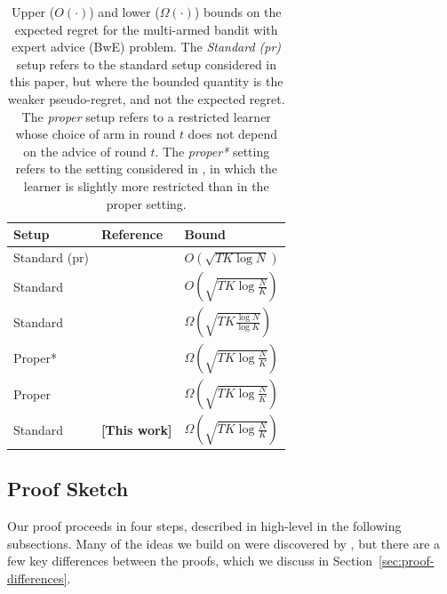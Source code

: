 \documentclass[a4paper,11pt]{article}
\theoremstyle{definition}
\begin{document}
\begin{table}[t]
  \centering
  \begin{tabular}{lll}
    \toprule
    Setup & Reference & Bound \\
    \midrule
    Standard (pr) & \cite{auer2002nonstochastic} & $O\left(\sqrt{TK \log N}\right)$ \\
    Standard & \cite{kale2014multiarmed} & $O\left(\sqrt{TK \log \frac{N}{K}}\right)$ \\
    Standard & \cite{seldin2016lower} & $\Omega\left(\sqrt{TK \frac{\log N}{\log K}}\right)$ \\
    Proper* & \cite{cesa2025improved} & $\Omega \left(\sqrt{TK \log \frac{N}{K}}\right)$ \\
    Proper & \cite{ito2024minimax} & $\Omega \left(\sqrt{TK \log \frac{N}{K}}\right)$ \\
    Standard & \textbf{[This work] } & $\Omega \left(\sqrt{TK \log \frac{N}{K}}\right)$ \\
    \bottomrule
  \end{tabular}
    \caption{Upper ($O(\cdot)$) and lower ($\Omega(\cdot)$) bounds on the expected regret for the multi-armed bandit with expert advice (BwE) problem. The \emph{Standard (pr)} setup refers to the standard setup considered in this paper, but where the bounded quantity is the weaker pseudo-regret, and not the expected regret. The \emph{proper} setup refers to a restricted learner whose choice of arm in round $t$ does not depend on the advice of round $t$.  The \emph{proper*} setting refers to the setting considered in \cite{cesa2025improved}, in which the learner is slightly more restricted than in the proper setting.}
    \label{tab:regretbound}
\end{table}

\subsection{Proof Sketch}
Our proof proceeds in four steps, described in high-level in the following subsections. Many of the ideas we build on were discovered by \cite{ito2024minimax}, but there are a few key differences between the proofs, which we discuss in Section~\ref{sec:proof-differences}.
\end{document}

